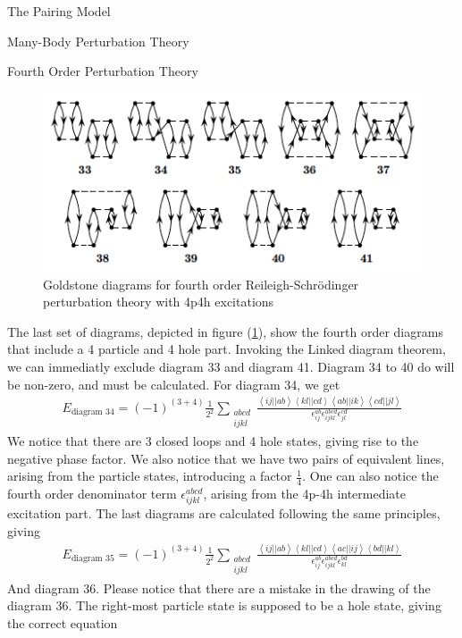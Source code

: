 \documentclass[twoside,english]{uiofysmaster}
\begin{document}
\begin{chapter}{The Pairing Model}
\begin{section}{Many-Body Perturbation Theory}
\begin{subsection}{Fourth Order Perturbation Theory}
			\begin{figure}[H]
				\includegraphics[width=\textwidth]{Figures/fourthorder4p4h.png}
				\caption{Goldstone diagrams for fourth order Reileigh-Schr\"{o}dinger perturbation theory with 4p4h excitations}
				\label{figure:mbpt4p4h}
			\end{figure}
			The last set of diagrams, depicted in figure (\ref{figure:mbpt4p4h}), show the fourth order diagrams that include a 4 particle and 4 hole part. Invoking the Linked diagram theorem, we can immediatly exclude diagram 33 and diagram 41. Diagram 34 to 40 do will be non-zero, and must be calculated. For diagram 34, we get
			\begin{align}
				E_{\text{diagram 34}} = \left(-1\right)^{(3+4)} \frac{1}{2^2} \sum_{\substack{abcd\\ijkl}} \frac{ \left<ij||ab\right>\left<kl||cd\right>\left<ab||ik\right>\left<cd||jl\right> }{ \epsilon_{ij}^{ab} \epsilon_{ijkl}^{abcd} \epsilon_{jl}^{cd} }
			\end{align}
			We notice that there are 3 closed loops and 4 hole states, giving rise to the negative phase factor. We also notice that we have two pairs of equivalent lines, arising from the particle states, introducing a factor $\frac{1}{4}$. One can also notice the fourth order denominator term $\epsilon_{ijkl}^{abcd}$, arising from the 4p-4h intermediate excitation part. The last diagrams are calculated following the same principles, giving 
			\begin{align}
				E_{\text{diagram 35}} = \left(-1\right)^{(3+4)} \frac{1}{2^2} \sum_{\substack{abcd\\ijkl}} \frac{ \left<ij||ab\right>\left<kl||cd\right>\left<ac||ij\right>\left<bd||kl\right> }{ \epsilon_{ij}^{ab} \epsilon_{ijkl}^{abcd} \epsilon_{kl}^{bd} }
			\end{align}
			And diagram 36. Please notice that there are a mistake in the drawing of the diagram 36. The right-most particle state is supposed to be a hole state, giving the correct equation 

\end{subsection}
\end{section}
\end{chapter}
\end{document}
